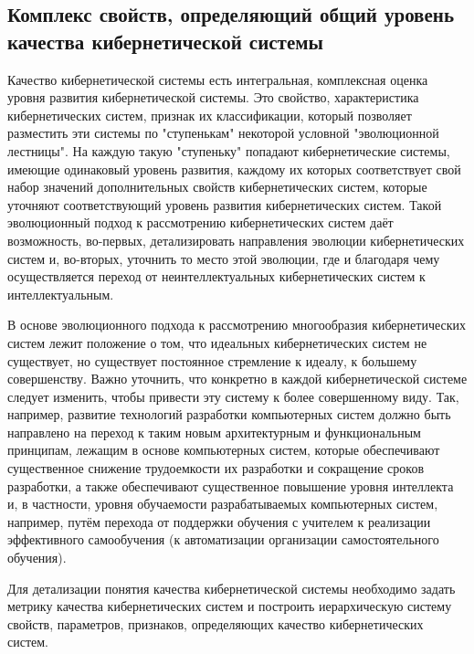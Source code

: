 \subsection{Комплекс свойств, определяющий общий уровень качества кибернетической системы}

Качество кибернетической системы есть интегральная, комплексная оценка уровня развития кибернетической системы. 
Это свойство, характеристика кибернетических систем, признак их классификации, который позволяет разместить эти системы по "ступенькам"{} некоторой условной "эволюционной лестницы"{}.
На каждую такую "ступеньку"{} попадают кибернетические системы, имеющие одинаковый уровень развития, каждому их которых соответствует свой набор значений дополнительных свойств кибернетических систем, которые уточняют соответствующий уровень развития кибернетических систем. 
Такой эволюционный подход к рассмотрению кибернетических систем даёт возможность, во-первых, детализировать направления эволюции кибернетических систем и, во-вторых, уточнить то место этой эволюции, где и благодаря чему осуществляется переход от неинтеллектуальных кибернетических систем к интеллектуальным.

В основе эволюционного подхода к рассмотрению многообразия кибернетических систем лежит положение о том, что идеальных кибернетических систем не существует, но существует постоянное стремление к идеалу, к большему совершенству. 
Важно уточнить, что конкретно в каждой кибернетической системе следует изменить, чтобы привести эту систему к более совершенному виду.
Так, например, развитие технологий разработки компьютерных систем должно быть направлено на переход к таким новым архитектурным и функциональным принципам, лежащим в основе компьютерных систем, которые обеспечивают существенное снижение трудоемкости их разработки и сокращение сроков разработки, а также обеспечивают существенное повышение уровня интеллекта и, в частности, уровня обучаемости разрабатываемых компьютерных систем, например, путём перехода от поддержки обучения с учителем к реализации эффективного самообучения (к автоматизации организации самостоятельного обучения). 

Для детализации понятия качества кибернетической системы необходимо задать метрику качества кибернетических систем и построить иерархическую систему свойств, параметров, признаков, определяющих качество кибернетических систем.

